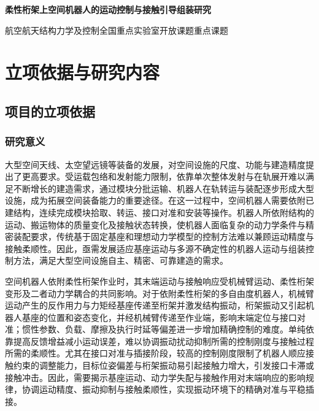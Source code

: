 \documentclass[UTF8,a4paper,zihao=-4,fontset=fandol]{ctexart}
\begin{document}
\begin{center}
 {\bfseries 柔性桁架上空间机器人的运动控制与接触引导组装研究\par
\par}
 \vspace{0.55em}
 {航空航天结构力学及控制全国重点实验室开放课题\quad 重点课题}
\end{center}
\vspace{0.35em}

\section{立项依据与研究内容}

\subsection{项目的立项依据}

\subsubsection{研究意义}

大型空间天线、太空望远镜等装备的发展，对空间设施的尺度、功能与建造精度提出了更高要求。受运载包络和发射能力限制，依靠单次整体发射与在轨展开难以满足不断增长的建造需求，通过模块分批运输、机器人在轨转运与装配逐步形成大型设施，成为拓展空间装备能力的重要途径\cite{hu2025,wu2024}。在这一过程中，空间机器人需要依附已建结构，连续完成模块拾取、转运、接口对准和安装等操作。机器人所依附结构的运动、搬运物体的质量变化及接触状态转换，使机器人面临复杂的动力学条件与精密装配要求，传统基于固定基座和理想动力学模型的控制方法难以兼顾运动精度与接触柔顺性。因此，亟需发展适应基座运动与多源不确定性的机器人运动与组装控制方法，满足大型空间设施自主、精密、可靠建造的需求。

空间机器人依附柔性桁架作业时，其末端运动与接触响应受机械臂运动、柔性桁架变形及二者动力学耦合的共同影响。对于依附柔性桁架的多自由度机器人，机械臂运动产生的反作用力与力矩经基座传递至桁架并激发结构振动，桁架振动又引起机器人基座的位置和姿态变化，并经机械臂传递至作业端，影响末端定位与接口对准；惯性参数、负载、摩擦及执行时延等偏差进一步增加精确控制的难度。单纯依靠提高反馈增益减小运动误差，难以协调振动扰动抑制所需的控制刚度与接触过程所需的柔顺性。尤其在接口对准与插接阶段，较高的控制刚度限制了机器人顺应接触约束的调整能力，目标位姿偏差与桁架振动易引起接触力增大，引发接口卡滞或接触冲击。因此，需要揭示基座运动、动力学失配与接触作用对末端响应的影响规律，协调运动精度、振动抑制与接触柔顺性，实现振动环境下的精确对准与平稳插接。
\end{document}
